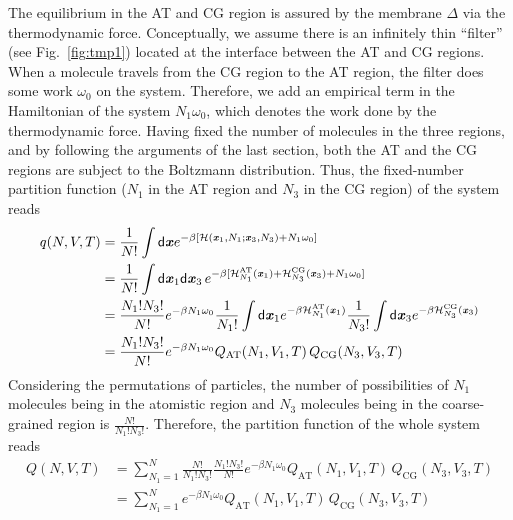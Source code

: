 \documentclass[aip,jcp,a4paper,reprint,onecolumn]{revtex4-1}
\newcommand{\recheck}[1]{{\color{red} #1}}
\newcommand{\vect}[1]{\textbf{\textit{#1}}}
\newcommand{\dd}[1]{\textsf{#1}}
\newcommand{\AT}{{\textrm{{AT}}}}
\newcommand{\CG}{{\textrm{CG}}}
\newcommand{\HY}{{\Delta}}
\begin{document}
The equilibrium in the AT and CG region is assured by the membrane $\HY$ via the thermodynamic force. Conceptually, we assume there is an infinitely thin
``filter'' (see Fig.~\ref{fig:tmp1}) located at the interface between
the AT and CG regions. When a molecule travels from the CG region to
the AT region, the filter does some work $\omega_0$ on the system.
Therefore, we add an empirical term in the Hamiltonian of the system
$N_1\omega_0$, which denotes the work done by the thermodynamic force.
Having fixed the number of molecules in the three regions, and by following the
arguments of the last section, both the AT and the CG regions are
subject to the Boltzmann distribution.
Thus, the fixed-number partition function ($N_1$ in the AT region and $N_3$ in the CG region) of the system reads
\begin{align}\nonumber
  q(N,V,T)
  &= \frac1{N!}\int
  \dd d\vect x
  e^{-\beta
    [\mathcal H(\vect x_1, N_1; \vect x_3, N_3) +
    N_1\omega_0]}\\\nonumber
  &= \frac1{N!}\int
  \dd d\vect x_1\dd d\vect x_3\,
  e^{-\beta
    [\mathcal H_{N_1}^{\AT}(\vect x_1) +
    \mathcal H_{N_3}^{\CG}(\vect x_3) +
    N_1\omega_0]}\\\nonumber
  & = \frac{N_1!N_3!}{N!}
  e^{-\beta N_1\omega_0}
  \frac{1}{N_1!}\int\dd d\vect x_1 e^{-\beta\mathcal H_{N_1}^{\AT}(\vect x_1)}
  \frac{1}{N_3!}\int\dd d\vect x_3 e^{-\beta\mathcal H_{N_3}^{\CG}(\vect x_3)}\\
  & = \frac{N_1!N_3!}{N!}
  e^{-\beta N_1\omega_0}
  Q_{\AT}(N_1, V_1, T)\,
  Q_{\CG}(N_3, V_3, T) 
\end{align}
Considering the permutations of particles, the number of possibilities of
$N_1$ molecules being in the atomistic region and $N_3$ molecules being
in the coarse-grained region is  $\frac{N!}{N_1!N_3!}$.
Therefore, the partition function of the whole system reads
\begin{align}\nonumber
  Q(N,V,T) &= \sum_{N_1=1}^N
  \frac{N!}{N_1!N_3!} \frac{N_1!N_3!}{N!}
  e^{-\beta N_1\omega_0}
  Q_{\AT}(N_1, V_1, T)\,
  Q_{\CG}(N_3, V_3, T) \\
  &= \sum_{N_1=1}^N
  e^{-\beta N_1\omega_0}
  Q_{\AT}(N_1, V_1, T)\,
  Q_{\CG}(N_3, V_3, T) 
\end{align}
\end{document}
